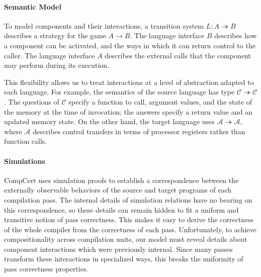 \paragraph{Semantic Model} %

To model components and their interactions,
a transition system $L : A \twoheadrightarrow B$
describes a strategy
for the game
$A \rightarrow B$.
The language interface $B$ describes how a component can be activated,
and the ways in which it can return control to the caller.
The language interface $A$ describes the external calls that the component
may perform during its execution.

This flexibility allows us to treat interactions
at a level of abstraction adapted to each language.
For example,
the semantics of
the source language  has type
\mbox{$\mathcal{C} \twoheadrightarrow \mathcal{C}$}.
The questions of $\mathcal{C}$ specify a function to call,
argument values,
and the state of the memory at the time of invocation;
the answers specify a return value and an updated memory state.
On the other hand, the target language  uses
$\mathcal{A} \twoheadrightarrow \mathcal{A}$,
where $\mathcal{A}$ describes control transfers
in terms of processor registers
rather than function calls.



\paragraph{Simulations} %

CompCert uses simulation proofs
to establish a correspondence between
the externally observable behaviors of
the source and target programs of each compilation pass.
The internal details of simulation relations
have no bearing on this correspondence,
so these details can remain hidden
to fit a uniform and transitive notion of pass correctness.
This makes it easy to derive the correctness
of the whole compiler
from the correctness of each pass.
%
Unfortunately,
to achieve compositionality across compilation units,
our model must reveal details
about component interactions
which were previously internal.
Since many passes transform
these interactions in
specialized ways,
this breaks the uniformity
of pass correctness properties.

